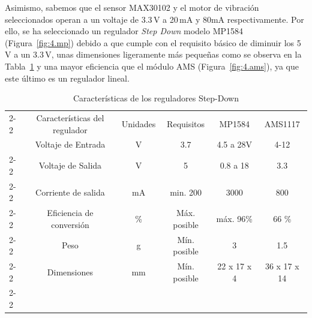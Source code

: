 Asimismo, sabemos que el sensor MAX30102 y el motor de vibración seleccionados operan a un voltaje de 3.3\,V a 20\,mA y 80mA respectivamente. Por ello, se ha seleccionado un regulador \textit{Step Down} modelo MP1584 (Figura~\ref{fig:4.mp}) debido a que cumple con el requisito básico de diminuir los 5\,V a un 3.3\,V, unas dimensiones ligeramente más pequeñas como se observa en la Tabla~\ref{tab:4.Caracteristicas regulador step-dopwn} y una mayor eficiencia que el módulo AMS (Figura~\ref{fig:4.ams}), ya que este último es un regulador lineal.



\begin{table}[H]
\centering
\caption{Características de los reguladores Step-Down}
\label{tab:4.Caracteristicas regulador step-dopwn}
\begin{tabular}{l|c|c|c||c|c|} 
\cline{2-2}\arrayrulecolor{black}\cline{3-3}\arrayrulecolor{black}\cline{4-6}
 & Características del regulador & Unidades & Requisitos   & MP1584      & AMS1117       \\ 
\hhline{~=>{\arrayrulecolor{black}}=>{\arrayrulecolor{black}}=::==|}
 & Voltaje de Entrada            & V        & 3.7          & 4.5 a 28V   & 4-12          \\ 
\cline{2-2}\arrayrulecolor{black}\cline{3-3}\arrayrulecolor{black}\cline{4-6}
 & Voltaje de Salida             & V        & 5            & 0.8 a 18    & 3.3           \\ 
\cline{2-2}\arrayrulecolor{black}\cline{3-3}\arrayrulecolor{black}\cline{4-6}
 & Corriente de salida           & mA       & min. 200     & 3000        & 800           \\ 
\cline{2-2}\arrayrulecolor{black}\cline{3-3}\arrayrulecolor{black}\cline{4-6}
 & Eficiencia de conversión      & \%       & Máx. posible & máx. 96\%   & 66 \%         \\ 
\cline{2-2}\arrayrulecolor{black}\cline{3-3}\arrayrulecolor{black}\cline{4-6}
 & Peso                          & g        & Mín. posible & 3           & 1.5           \\ 
\cline{2-2}\arrayrulecolor{black}\cline{3-3}\arrayrulecolor{black}\cline{4-6}
 & Dimensiones                   & mm       & Mín. posible & 22 x 17 x 4 & 36 x 17 x 14  \\
\cline{2-2}\arrayrulecolor{black}\cline{3-3}\arrayrulecolor{black}\cline{4-6}
\end{tabular}
\end{table}
